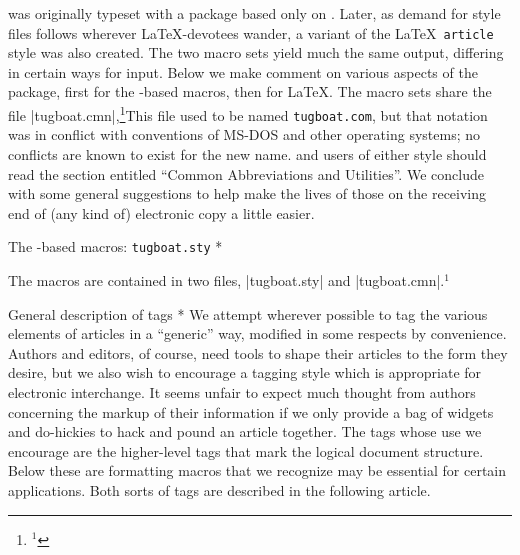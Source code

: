 \TUB\/ was originally typeset with a package based only on \plain.
Later, as demand for style files follows wherever
\LaTeX-devotees wander, a \TUB\/ variant of the \LaTeX\ {\tt article}
style was also created.  The two macro sets yield
much the same output, differing in certain ways for input.  Below we
make comment on various aspects of the \TUB\/ package, first for the
\plain-based macros, then for \LaTeX.  The macro sets share
the file |tugboat.cmn|,\footnote{$^1$}{This file used to be named
{\tt tugboat.com}, but that notation was in conflict with conventions
of MS-DOS and other operating systems; no conflicts are known to
exist for the new name.} and users of either style should read the
section entitled ``Common Abbreviations and Utilities''.  We conclude
with some general suggestions to help make the lives of those on the
receiving end of (any kind of) electronic copy a little easier.


\head * The \plain-based macros: {\tt tugboat.sty} *

The macros are contained in two files, |tugboat.sty| and |tugboat.cmn|.$^1$

\subhead * General description of tags *
We attempt wherever possible to tag the various elements of \TUB\/
articles in a ``generic'' way, modified in some respects by
convenience.  Authors and editors, of course, need tools to shape
their articles to the form they desire, but we also wish to encourage
a tagging style which is appropriate for electronic interchange.  It
seems unfair to expect much thought from authors concerning the
markup of their information if we only provide a bag of widgets and
do-hickies to hack and pound an article together.  The tags whose use
we encourage are the higher-level tags that mark the logical
document structure.  Below these are formatting macros that we
recognize may be essential for certain applications.  Both sorts of
tags are described in the following article.

